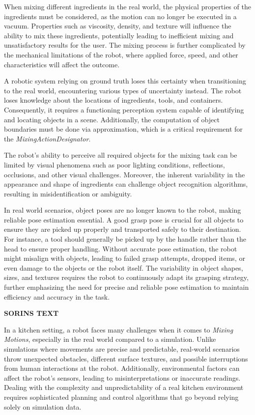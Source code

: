 When mixing different ingredients in the real world, the physical properties of the ingredients must be considered, 
as the motion can no longer be executed in a vacuum. Properties such as viscosity, density, 
and texture will influence the ability to mix these ingredients, potentially leading to inefficient mixing and 
unsatisfactory results for the user. 
The mixing process is further complicated by the mechanical limitations of the robot, 
where applied force, speed, and other characteristics will affect the outcome.

A robotic system relying on ground truth loses this certainty when transitioning to the real world, 
encountering various types of uncertainty instead. 
The robot loses knowledge about the locations of ingredients, tools, and containers. 
Consequently, it requires a functioning perception system capable of identifying and locating objects in a scene. 
Additionally, the computation of object boundaries must be done via approximation, which is a critical requirement for the \textit{MixingActionDesignator}.

The robot's ability to perceive all required objects for the mixing task can be limited by 
visual phenomena such as poor lighting conditions, reflections, occlusions, and other visual challenges. 
Moreover, the inherent variability in the appearance and shape of ingredients can challenge object recognition algorithms, resulting in misidentification or ambiguity.

In real world scenarios, object poses are no longer known to the robot, 
making reliable pose estimation essential. 
A good grasp pose is crucial for all objects to ensure they are picked up properly and transported safely to their destination. 
For instance, a tool should generally be picked up by the handle rather than the head to ensure proper handling. 
Without accurate pose estimation, the robot might misalign with objects, leading to failed grasp attempts, dropped items,
or even damage to the objects or the robot itself. The variability in object shapes, sizes, 
and textures requires the robot to continuously adapt its grasping strategy, further emphasizing the need for precise and reliable pose estimation 
to maintain efficiency and accuracy in the task.



\textbf{SORINS TEXT}

In a kitchen setting, a robot faces many challenges when it comes to \textit{Mixing Motions}, especially in the real world compared to a simulation.
Unlike simulations where movements are precise and predictable, real-world scenarios throw unexpected obstacles, different surface textures, and possible interruptions from human interactions at the robot.
Additionally, environmental factors can affect the robot's sensors, leading to misinterpretations or inaccurate readings.
Dealing with the complexity and unpredictability of a real kitchen environment requires sophisticated planning and control algorithms that go beyond relying solely on simulation data.

